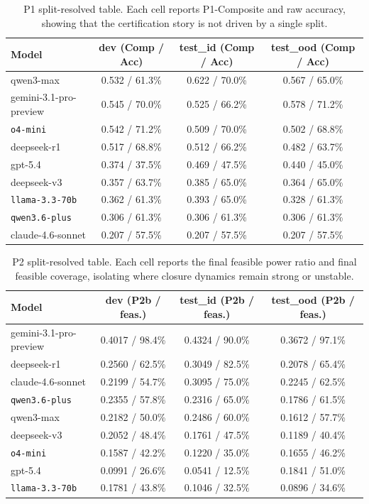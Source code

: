 \begin{table}[t]
\caption{P1 split-resolved table. Each cell reports P1-Composite and raw accuracy, showing that the certification story is not driven by a single split.}
\label{tab:appendix_p1_split}
\centering
\small
\begin{tabular}{lccc}
\toprule
Model & dev (Comp / Acc) & test\_id (Comp / Acc) & test\_ood (Comp / Acc) \\
\midrule
qwen3-max & 0.532 / 61.3\% & 0.622 / 70.0\% & 0.567 / 65.0\% \\
gemini-3.1-pro-preview & 0.545 / 70.0\% & 0.525 / 66.2\% & 0.578 / 71.2\% \\
\texttt{o4-mini} & 0.542 / 71.2\% & 0.509 / 70.0\% & 0.502 / 68.8\% \\
deepseek-r1 & 0.517 / 68.8\% & 0.512 / 66.2\% & 0.482 / 63.7\% \\
gpt-5.4 & 0.374 / 37.5\% & 0.469 / 47.5\% & 0.440 / 45.0\% \\
deepseek-v3 & 0.357 / 63.7\% & 0.385 / 65.0\% & 0.364 / 65.0\% \\
\texttt{llama-3.3-70b} & 0.362 / 61.3\% & 0.393 / 65.0\% & 0.328 / 61.3\% \\
\texttt{qwen3.6-plus} & 0.306 / 61.3\% & 0.306 / 61.3\% & 0.306 / 61.3\% \\
claude-4.6-sonnet & 0.207 / 57.5\% & 0.207 / 57.5\% & 0.207 / 57.5\% \\
\bottomrule
\end{tabular}
\end{table}

\begin{table}[t]
\caption{P2 split-resolved table. Each cell reports the final feasible power ratio and final feasible coverage, isolating where closure dynamics remain strong or unstable.}
\label{tab:appendix_p2_split}
\centering
\small
\begin{tabular}{lccc}
\toprule
Model & dev (P2b / feas.) & test\_id (P2b / feas.) & test\_ood (P2b / feas.) \\
\midrule
gemini-3.1-pro-preview & 0.4017 / 98.4\% & 0.4324 / 90.0\% & 0.3672 / 97.1\% \\
deepseek-r1 & 0.2560 / 62.5\% & 0.3049 / 82.5\% & 0.2078 / 65.4\% \\
claude-4.6-sonnet & 0.2199 / 54.7\% & 0.3095 / 75.0\% & 0.2245 / 62.5\% \\
\texttt{qwen3.6-plus} & 0.2355 / 57.8\% & 0.2316 / 65.0\% & 0.1786 / 61.5\% \\
qwen3-max & 0.2182 / 50.0\% & 0.2486 / 60.0\% & 0.1612 / 57.7\% \\
deepseek-v3 & 0.2052 / 48.4\% & 0.1761 / 47.5\% & 0.1189 / 40.4\% \\
\texttt{o4-mini} & 0.1587 / 42.2\% & 0.1220 / 35.0\% & 0.1655 / 46.2\% \\
gpt-5.4 & 0.0991 / 26.6\% & 0.0541 / 12.5\% & 0.1841 / 51.0\% \\
\texttt{llama-3.3-70b} & 0.1781 / 43.8\% & 0.1046 / 32.5\% & 0.0896 / 34.6\% \\
\bottomrule
\end{tabular}
\end{table}

